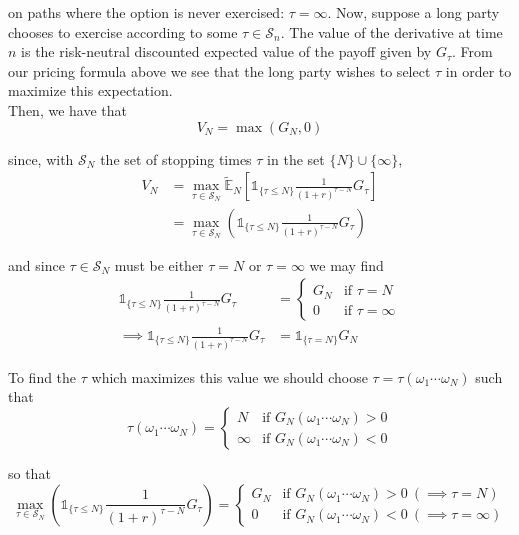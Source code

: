 \documentclass[12pt]{article}
\newcommand{\E}{\mathbb E}
\begin{document}
on paths where the option is never exercised: $\tau = \infty$. Now, suppose a long party chooses to exercise according to some $\tau \in \mathcal S_n$. The value of the derivative at time $n$ is the risk-neutral discounted expected value of the payoff given by $G_\tau$. From our pricing formula above we see that the long party wishes to select $\tau$ in order to maximize this expectation. \\

Then, we have that
\begin{equation*}
	V_N = \max (G_N, 0)
\end{equation*}

since, with $\mathcal S_N$ the set of stopping times $\tau$ in the set $\{N\}\cup\{\infty\}$,
\begin{align*}
	V_N &= \max_{\tau \in \mathcal S_N} \tilde{\E}_N \left[ \mathds 1_{\{\tau \leq N\}} \frac{1}{(1 + r)^{\tau - N}} G_{\tau} \right] \\
	&= \max_{\tau \in \mathcal S_N} \left( \mathds 1_{\{\tau \leq N\}} \frac{1}{(1 + r)^{\tau - N}} G_{\tau} \right)
\end{align*}

and since $\tau \in \mathcal S_N$ must be either $\tau = N$ or $\tau = \infty$ we may find
\begin{align*}
	\mathds 1_{\{\tau \leq N\}} \frac{1}{(1 + r)^{\tau - N}} G_{\tau} &=
	\begin{cases}
		G_N & \text{if } \tau = N \\
		0 & \text{if } \tau = \infty
	\end{cases} \\
	\implies \mathds 1_{\{\tau \leq N\}} \frac{1}{(1 + r)^{\tau - N}} G_{\tau} &= \mathds 1_{\{\tau = N\}} G_N
\end{align*}

To find the $\tau$ which maximizes this value we should choose $\tau = \tau(\omega_1\cdots\omega_N)$ such that
\begin{equation*}
	\tau(\omega_1\cdots\omega_N) = 
	\begin{cases}
		N & \text{if } G_N(\omega_1\cdots\omega_N) > 0 \\
		\infty & \text{if } G_N(\omega_1\cdots\omega_N) < 0 
	\end{cases}
\end{equation*}

so that
\begin{equation*}
	\max_{\tau \in \mathcal S_N} \left( \mathds 1_{\{\tau \leq N\}} \frac{1}{(1 + r)^{\tau - N}} G_{\tau} \right) = 
	\begin{cases}
		G_N & \text{if } G_N(\omega_1\cdots\omega_N) > 0~(\implies \tau = N) \\
		0 & \text{if } G_N(\omega_1\cdots\omega_N) < 0~(\implies \tau = \infty) 
	\end{cases}
\end{equation*}
\end{document}
